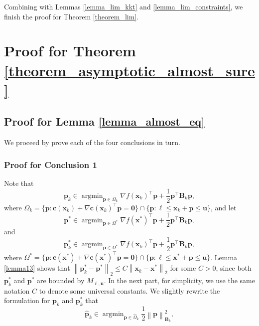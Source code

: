 \documentclass[aos]{imsart}
\numberwithin{equation}{section}
\theoremstyle{plain}
\begin{document}
\begin{appendix}
Combining with Lemmas \ref{lemma_lim_kkt} and \ref{lemma_lim_constraints}, we finish the proof for Theorem \ref{theorem_lim}.


\newpage
\section{Proof for Theorem \ref{theorem_asymptotic_almost_sure}}
\subsection{Proof for Lemma \ref{lemma_almost_eq}}
\label{sec:appendix3.1}
We proceed by prove each of the four conclusions in turn. 

\subsubsection{Proof for Conclusion 1} 
Note that 
    \begin{equation*}
            \bm{p}_{k} \in \mathop{\arg \min}_{\bm{p} \in \Omega_{k}} \nabla f(\bm{x}_{k})^{\top} \bm{p} + \frac{1}{2} \bm{p}^{\top} \bm{B}_{k} \bm{p},
    \end{equation*}
    where $\Omega_k = \{\bm{p}: \bm{c}(\bm{x}_k)+\nabla \bm{c}(\bm{x}_k)^{\top}\bm{p} = \bm{0}\} \cap \{\bm{p}: \bm{\ell} \leq \bm{x}_k + \bm{p} \leq \bm{u}\} $, and let
    \begin{equation*}
        \bm{p}^{*} \in \mathop{\arg \min}_{\bm{p} \in \Omega^{*}} \nabla f(\bm{x}^{*})^{\top} \bm{p} + \frac{1}{2} \bm{p}^{\top} \bm{B}_{k} \bm{p},
    \end{equation*}
    and
    \begin{equation*}
        \bm{p}_{k}^{*} \in \mathop{\arg \min}_{\bm{p} \in \Omega^{*}} \nabla f(\bm{x}_{k})^{\top} \bm{p} + \frac{1}{2} \bm{p}^{\top} \bm{B}_{k} \bm{p},
    \end{equation*}
    where $\Omega^{*} = \{\bm{p}: \bm{c}(\bm{x}^{*})+\nabla \bm{c}(\bm{x}^{*})^{\top}\bm{p} = \bm{0}\} \cap \{\bm{p}: \bm{\ell} \leq \bm{x}^{*} + \bm{p} \leq \bm{u}\} $. Lemma \ref{lemma13} shows that $\left\| \bm{p}_{k}^{*} - \bm{p}^{*} \right\|_2 \leq C \left\| \bm{x}_{k} - \bm{x}^{*} \right\|_2$ for some $C > 0$, since both $\bm{p}_{k}^{*} $ and $\bm{p}^{*}$ are bounded by $M_{\bm{\ell}, \bm{u}}$. In the next part, for simplicity, we use the same notation $C$ to denote some universal constants. We slightly rewrite the formulation for $\bm{p}_{k}$ and $\bm{p}_{k}^{*} $ that
    \begin{equation*}
        \hat{\bm{p}}_{k} \in \mathop{\arg \min}_{\bm{p} \in \widehat{\Omega}_{k}} \frac{1}{2}\left\| \bm{p} \right\|_{\bm{B}_k}^2,

\end{equation*}
\end{appendix}
\end{document}
